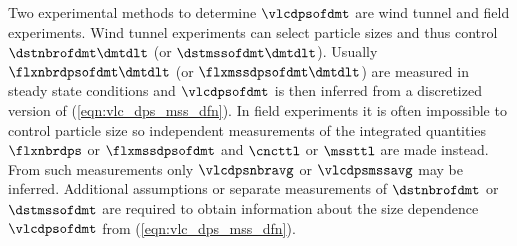 \documentclass[12pt,twoside]{book}
\begin{document}
Two experimental methods to determine $\vlcdpsofdmt$ are wind tunnel
and field experiments.
Wind tunnel experiments can select particle sizes and thus control 
$\dstnbrofdmt \dmtdlt$ (or $\dstmssofdmt \dmtdlt$).
Usually $\flxnbrdpsofdmt \dmtdlt$ (or $\flxmssdpsofdmt \dmtdlt$) 
are measured in steady state conditions and $\vlcdpsofdmt$ is then
inferred from a discretized version of (\ref{eqn:vlc_dps_mss_dfn}).
In field experiments it is often impossible to control particle size
so independent measurements of the integrated quantities $\flxnbrdps$
or $\flxmssdpsofdmt$ and $\cncttl$ or $\mssttl$ are made instead. 
From such measurements only $\vlcdpsnbravg$ or $\vlcdpsmssavg$ may be 
inferred. 
Additional assumptions or separate measurements of $\dstnbrofdmt$ or
$\dstmssofdmt$ are required to obtain information about the size
dependence $\vlcdpsofdmt$ from (\ref{eqn:vlc_dps_mss_dfn}). 
\end{document}
